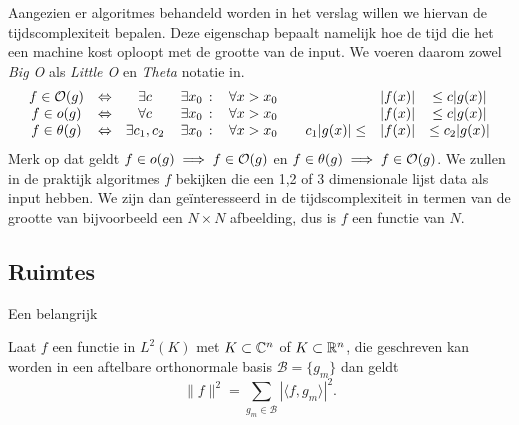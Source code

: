 Aangezien er algoritmes behandeld worden in het verslag willen we hiervan de tijdscomplexiteit bepalen.
Deze eigenschap bepaalt namelijk hoe de tijd die het een machine kost oploopt met de grootte van de input.
We voeren daarom zowel \emph{Big O} als \emph{Little O} en \emph{Theta} notatie in.
\begin{equation*}
\begin{array}{cccccccc}
  f \in \mathcal{O}(g)     &\Leftrightarrow& \exists c     \,&\exists x_0  \,:&\, 
  \forall x>x_0 \quad&& |f(x)| &\leq c|g(x)|  \\
  f \in o(g)      &\Leftrightarrow& \forall c     \,&\exists x_0  \,:&\, 
  \forall x>x_0 \quad&& |f(x)| &\leq c |g(x)| \\ 
  f \in \theta(g) &\Leftrightarrow& \exists c_1,c_2\,&\exists x_0  \,:&\, 
  \forall x>x_0 \quad& c_1|g(x)| \leq & |f(x)| &\leq c_2|g(x)| 
\end{array}
\end{equation*}
Merk op dat geldt $f\in o(g) \implies f\in \mathcal{O}(g)$ en $f\in \theta(g) \implies f\in \mathcal{O}(g)$.
We zullen in de praktijk algoritmes $f$ bekijken die een 1,2 of 3 dimensionale lijst data als input hebben.
We zijn dan ge\"interesseerd in de tijdscomplexiteit in termen van de grootte van bijvoorbeeld een $N\times N$ 
afbeelding, dus is $f$ een functie van $N$.

\subsection{Ruimtes}
Een belangrijk 
\begin{lemm}
  \label{parseval}
  Laat $f$ een functie in $L^2(K)$ met $K \subset \mathbb{C}^n$ of $K\subset\mathbb{R}^n$, die geschreven kan worden in een aftelbare 
  orthonormale basis $\mathcal{B}=\{g_m\}$ dan geldt
  \[
  \|f\|^2 = \sum_{g_m\in\mathcal{B}} | \langle f, g_m \rangle |^2.
  \]
\end{lemm}


